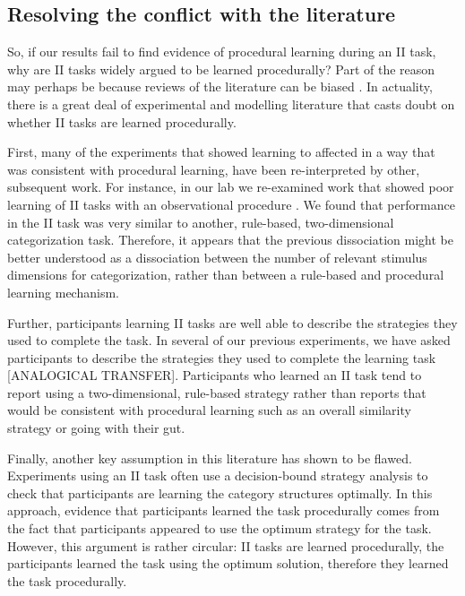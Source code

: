 \documentclass[12pt]{article}
\begin{document}
\subsection{Resolving the conflict with the literature}
So, if our results fail to find evidence of procedural learning during an II task, why are II tasks widely argued to be learned procedurally?
Part of the reason may perhaps be because reviews of the literature can be biased \cite{Wills2019}. 
In actuality, there is a great deal of experimental and modelling literature that casts doubt on whether II tasks are learned procedurally. 

First, many of the experiments that showed learning to affected in a way that was consistent with procedural learning, have been re-interpreted by other, subsequent work. 
For instance, in our lab we re-examined work that showed poor learning of II tasks with an observational procedure \cite{Ashby2002a}. 
We found that performance in the II task was very similar to another, rule-based, two-dimensional categorization task. 
Therefore, it appears that the previous dissociation might be better understood as a dissociation between the number of relevant stimulus dimensions for categorization, rather than between a rule-based and procedural learning mechanism. 

Further, participants learning II tasks are well able to describe the strategies they used to complete the task. 
In several of our previous experiments, we have asked participants to describe the strategies they used to complete the learning task \cite{Edmunds2015, Edmunds2017}[ANALOGICAL TRANSFER]. 
Participants who learned an II task tend to report using a two-dimensional, rule-based strategy rather than reports that would be consistent with procedural learning such as an overall similarity strategy or going with their gut. 

Finally, another key assumption in this literature has shown to be flawed. 
Experiments using an II task often use a decision-bound strategy analysis to check that participants are learning the category structures optimally. 
In this approach, evidence that participants learned the task procedurally comes from the fact that participants appeared to use the optimum strategy for the task. 
However, this argument is rather circular: II tasks are learned procedurally, the participants learned the task using the optimum solution, therefore they learned the task procedurally. 
\end{document}
